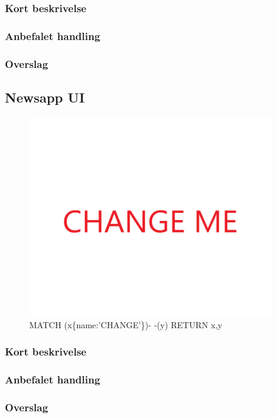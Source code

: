\documentclass{article}
\begin{document}
\subsubsection{Kort beskrivelse}
\subsubsection{Anbefalet handling}
\subsubsection{Overslag}
\newpage{}
\clearpage


\subsection{Newsapp UI}
\begin{figure}[h]
\includegraphics[width=300pt]{CHANGE.PNG}
\caption{MATCH (x\{name:'CHANGE'\})- -(y) RETURN x,y}
\end{figure}
\subsubsection{Kort beskrivelse}
\subsubsection{Anbefalet handling}
\subsubsection{Overslag}
\end{document}
